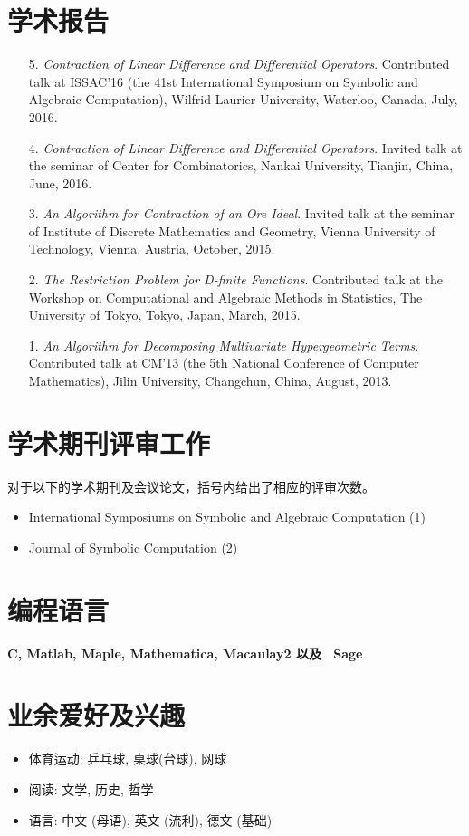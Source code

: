 \documentclass[a4paper,12pt]{article}
\begin{document}
\begin{CJK*}{UTF8}{gbsn}
\section*{\Large{学术报告}}
\begin{itemize}
 \item[5.] {\em Contraction of Linear Difference and Differential Operators}. Contributed talk at ISSAC'16 
 (the 41st International Symposium on Symbolic and Algebraic Computation), Wilfrid Laurier University, Waterloo, Canada, July, 2016.
 \item[4.] {\em Contraction of Linear Difference and Differential Operators}.
       Invited talk at the seminar of Center for Combinatorics, Nankai University, Tianjin, China, June, 2016.
 \item[3.] {\em An Algorithm for Contraction of an Ore Ideal}. Invited talk at the seminar of Institute of Discrete Mathematics and Geometry, 
       Vienna University of Technology, Vienna, Austria, October, 2015.
 \item[2.] {\em The Restriction Problem for D-finite Functions}. 
       Contributed talk at the Workshop on Computational and Algebraic Methods in Statistics,
       The University of Tokyo, Tokyo, Japan, March, 2015.
 \item[1.] {\em An Algorithm for Decomposing Multivariate Hypergeometric Terms}. Contributed talk at CM'13
       (the 5th National Conference of Computer Mathematics), Jilin University, Changchun, China, August, 2013.
\end{itemize}

\section*{\Large 学术期刊评审工作}
对于以下的学术期刊及会议论文，括号内给出了相应的评审次数。
\begin{itemize}
 \item International Symposiums on Symbolic and Algebraic Computation (1)
 \item Journal of Symbolic Computation (2)
\end{itemize}

\section*{\Large{编程语言}}
\vspace{.05in}
{\bf C, Matlab, Maple, Mathematica, Macaulay2 以及 \ Sage}

\section*{\Large{业余爱好及兴趣}}
\begin{itemize}
 \item 体育运动: 乒乓球, 桌球(台球), 网球
 \item 阅读: 文学, 历史, 哲学
 \item 语言: 中文 (母语), 英文 (流利), 德文 (基础)
\end{itemize}

\end{CJK*}
\end{document}

